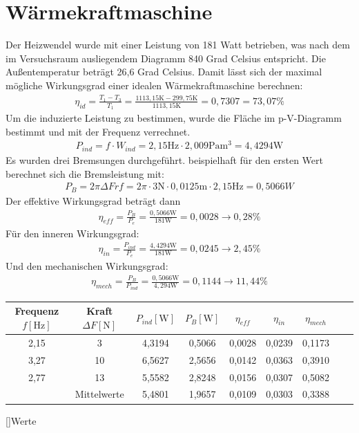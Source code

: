 \documentclass[12pt,a4paper]{scrartcl}
\begin{document}
    \section{Wärmekraftmaschine}
    	Der Heizwendel wurde mit einer Leistung von 181 Watt betrieben, was nach dem im Versuchsraum ausliegendem Diagramm 840 Grad Celsius entspricht. Die Außentemperatur beträgt 26,6 Grad Celsius.
        Damit lässt sich der maximal mögliche Wirkungsgrad einer idealen Wärmekraftmaschine berechnen:
        \begin{align*}
        	\eta_{id} = \frac{T_1 - T_3}{T_1} = \frac{1113,15 \si{\kelvin} - 299,75 \si{\kelvin}}{1113,15 \si{\kelvin}} = 0,7307 = 73,07 \%
        \end{align*}
        Um die induzierte Leistung zu bestimmen, wurde die Fläche im p-V-Diagramm bestimmt und mit der Frequenz verrechnet.
        \begin{align*}
        P_{ind} = f \cdot W_{ind} = 2,15 \si{\hertz} \cdot 2,009 \si{\pascal\metre^3} = 4,4294 \si{\watt}
        \end{align*}
        Es wurden drei Bremsungen durchgeführt. beispielhaft für den ersten Wert berechnet sich die Bremsleistung mit:
        \begin{align*}
        	P_B = 2\pi  \Delta F r f = 2\pi \cdot 3 \si{\newton} \cdot 0,0125 \si{\metre} \cdot 2,15 \si{\hertz} = 0,5066 W
        \end{align*}
        Der effektive Wirkungsgrad beträgt dann 
        \begin{align*}
        	\eta_{eff} = \frac{P_B}{P_e} = \frac{0,5066 \si{\watt}}{181 \si{\watt}} = 0,0028 \rightarrow  0,28 \%
        \end{align*}
        Für den inneren Wirkungsgrad:
        \begin{align*}
        	\eta_{in} = \frac{P_{ind}}{P_e} = \frac{4,4294 \si{\watt}}{181 \si{\watt} } = 0,0245 \rightarrow  2,45\%
        \end{align*}
        Und den mechanischen Wirkungsgrad:
        \begin{align*}
        	\eta_{mech} = \frac{P_B}{P_{ind}} = \frac{0,5066 \si{\watt}}{4,294 \si{\watt}} = 0,1144 \rightarrow  11,44\%
        \end{align*}
        \begin{center}
        \begin{tabular}{c|cccccccc}
            Frequenz $f [\si{\hertz}]$ & Kraft $\Delta F [\si{\newton}]$& $P_{ind} [\si{\watt}]$ & $P_B [\si{\watt}]$	& $\eta_{eff}$	&$\eta_{in}$	&$\eta_{mech}$\\ \hline \hline
			2,15	&3	&4,3194	&0,5066	&0,0028	&0,0239	&0,1173\\
			3,27	&10	&6,5627	&2,5656	&0,0142	&0,0363	&0,3910\\
			2,77	&13	&5,5582	&2,8248	&0,0156	&0,0307	&0,5082\\ \hline
			&Mittelwerte&5,4801	&1,9657	&0,0109	&0,0303	&0,3388
        \end{tabular}
        []{Werte}
        \end{center}
        
\end{document}
